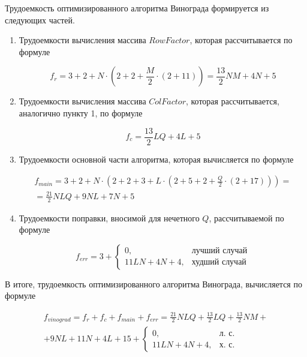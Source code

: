 Трудоемкость оптимизированного алгоритма Винограда формируется из следующих частей.
\begin{enumerate}
	\item Трудоемкости вычисления массива $RowFactor$, которая рассчитывается по формуле
	
	\begin{equation}
		\label{eq:opt_rf}
		f_{r} = 3 + 2 + N \cdot (2 + 2 + \frac{M}{2} \cdot (2 + 11)) = \frac{13}{2}NM + 4N + 5
	\end{equation}
	
	\item Трудоемкости вычисления массива $ColFactor$, которая рассчитывается, аналогично пункту 1, по формуле
	
	\begin{equation}
		\label{eq:opt_rс}
		f_{c} = \frac{13}{2}LQ + 4L + 5
	\end{equation}
	
	\item Трудоемкости основной части алгоритма, которая вычисляется по формуле
	
	\begin{equation}
		\label{eq:opt_vin_main}
		\begin{gathered}
			f_{main} = 3 + 2 + N \cdot (2 + 2 + 3 + L \cdot (2 + 5 + 2 + \frac{Q}{2} \cdot (2 + 17))) = \\
			= \frac{21}{2} NLQ + 9NL + 7N + 5
		\end{gathered}
	\end{equation}
	
	\item Трудоемкости поправки, вносимой для нечетного $Q$, рассчитываемой по формуле 
	
	\begin{equation}
		\label{eq:opt_vin_error}
		f_{err} = 3 +
		\begin{cases}
			0, & \text{лучший случай}\\
			11LN + 4N + 4, & \text{худший случай}
		\end{cases}
	\end{equation}
	
\end{enumerate}


В итоге, трудоемкость оптимизированного алгоритма Винограда, вычисляется по формуле

\begin{equation}
	\label{eq:opt_vinograd}
	\begin{gathered}
		f_{vinograd} = f_{r} + f_{c} + f_{main} + f_{err} = \frac{21}{2}NLQ + \frac{13}{2}LQ + \frac{13}{2} NM + \\
		+ 9NL + 11N + 4L + 15 + 
		\begin{cases}
			0, & \text{л.~с.}\\
			11LN + 4N + 4, & \text{х.~с.}
		\end{cases}
	\end{gathered}
\end{equation}


